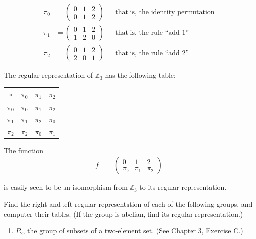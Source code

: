 \documentclass[twoside]{amsart}
\newcommand{\Integers}{\ensuremath{\mathbb{Z}{}}\xspace}
\begin{document}
\begin{enumerate}[A.]
   \begin{align*}
      \pi_0 &= 
         \begin{pmatrix}
            0 & 1 & 2 \\
            0 & 1 & 2 
         \end{pmatrix} && \text{that is, the identity permutation}\\
      \pi_1 &= 
         \begin{pmatrix}
            0 & 1 & 2 \\
            1 & 2 & 0
         \end{pmatrix} && \text{that is, the rule ``add 1''} \\
      \pi_2 &=
         \begin{pmatrix}
            0 & 1 & 2 \\
            2 & 0 & 1
         \end{pmatrix} && \text{that is, the rule ``add 2''}
   \end{align*}

   The regular representation of $\Integers_3$ has the following table:

   \begin{center}
   \begin{tabular}{c|ccc}
      $\circ$ & $\pi_0$ & $\pi_1$ & $\pi_2$ \\ \hline
      $\pi_0$ & $\pi_0$ & $\pi_1$ & $\pi_2$ \\
      $\pi_1$ & $\pi_1$ & $\pi_2$ & $\pi_0$ \\
      $\pi_2$ & $\pi_2$ & $\pi_0$ & $\pi_1$ 
   \end{tabular}
   \end{center}

   The function 
   \begin{align*}
      f &= 
         \begin{pmatrix}
            0     &  1    &  2  \\
            \pi_0 & \pi_1 & \pi_2
         \end{pmatrix}
   \end{align*}

   is easily seen to be an isomorphism from $\Integers_3$ to its regular
   representation.

   Find the right and left regular representation of each of the following
   groups, and computer their tables. (If the group is abelian, find its
   regular representation.)

   \begin{enumerate}[1]
      \item $P_2$, the group of subsets of a two-element set. (See
      Chapter 3, Exercise C.)


\end{enumerate}
\end{enumerate}
\end{document}
